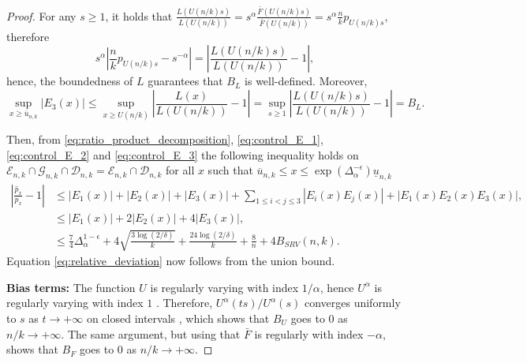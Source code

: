 \documentclass{article}
\numberwithin{equation}{section}
\begin{document}
\begin{proof}
    For any \(s\geq 1\), it holds that \(\frac{L(U(n/k)s)}{L(U(n/k))}
        = s^{\alpha}\frac{\bar{F} \left(
        U(n/k)s \right) }{\bar{F} \left(
    U(n/k)\right)} = s^{\alpha}\frac{n}{k} p_{U(n/k)s}\), therefore
    \begin{equation}\label{eq:B_L_alternative_form}
        s^{\alpha}\left|
        \frac{n}{k}p_{U(n/k)s} - s^{-\alpha} \right| =
        \left|\frac{L(U(n/k)s)}{L(U(n/k))}-1\right|,
    \end{equation}
    hence, the boundedness of \(L\) guarantees that \(B_L\) is
    well-defined. Moreover,
    \begin{equation}\label{eq:control_E_3}
        \sup_{x\geq \overline{u}_{n,k}} |E_3(x)|\leq \sup_{x\geq  U(n/k)}
        \left|\frac{L(x)}{L(U(n/k))} -1\right| = \sup_{s\geq 1}
        \left|\frac{L(U(n/k)s)}{L(U(n/k))}-1\right| = B_{L}.
    \end{equation}

    Then,
    from \eqref{eq:ratio_product_decomposition}, \eqref{eq:control_E_1},
    \eqref{eq:control_E_2} and \eqref{eq:control_E_3} the following
    inequality holds
    on
    \(\mathcal{E}_{n,k}\cap\mathcal{G}_{n,k}\cap\mathcal{D}_{n,k}=\mathcal{E}_{n,k}\cap\mathcal{D}_{n,k}\)
    for all \(x\) such that \(\overline{u}_{n,k}\leq x\leq
    \exp{\left(\Delta_\alpha^{-\epsilon}\right)}\underline{u}_{n,k}\)
    \begin{align*}
        \left|\frac{\widehat{p}_x}{p_x}-1\right| & \leq
        |E_1(x)|+|E_2(x)|+|E_3(x)| + \sum_{1\leq i<j\leq
        3}|E_i(x)E_j(x)| + |E_1(x)E_2(x)E_3(x)|, \nonumber
        \\
        & \leq |E_1(x)| + 2|E_2(x)|+ 4|E_3(x)|,\nonumber
        \\
        & \leq \frac{7}{4} \Delta_{\alpha}^{1-\epsilon} +
        4\sqrt{\frac{3\log(2/\delta)}{k}} +
        \frac{24\log(2/\delta)}{k} + \frac{8}{n} +
        4B_{SRV}(n,k).
    \end{align*}
    Equation \eqref{eq:relative_deviation} now follows from
    the union bound.

    \textbf{Bias terms:} The function \(U\) is regularly varying with
    index \(1/\alpha\), hence \(U^{\alpha}\)
    is regularly varying with index \(1\) \cite[Proposition
    1.5.7]{Bingham1987}. Therefore,
    \(U^{\alpha}(ts)/U^{\alpha}(s)\) converges uniformly to \(s\) as
    \(t\to +\infty\)
    on closed intervals \cite[Theorem 1.5.2]{Bingham1987}, which shows
    that
    \(B_U\)
    goes to \(0\) as \(n/k\to +\infty\). The same argument, but using that
    \(\bar{F}\) is regularly with index \(-\alpha\), shows that
    \(B_F\) goes to \(0\)
    as \(n/k\to+\infty\).


\end{proof}
\end{document}
